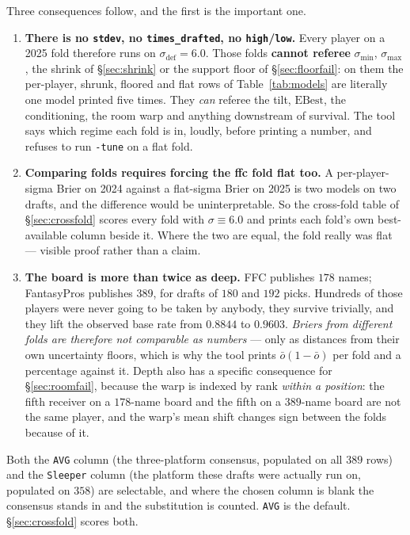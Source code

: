 \documentclass[10pt,a4paper]{article}
\theoremstyle{plain}
\theoremstyle{definition}
\theoremstyle{remark}
\newcommand{\code}[1]{\texttt{\small #1}}
\begin{document}
Three consequences follow, and the first is the important one.

\begin{enumerate}
\item \textbf{There is no \code{stdev}, no \code{times\_drafted}, no \code{high}/\code{low}.}
Every player on a 2025 fold therefore runs on $\sigma_{\text{def}} = 6.0$. Those folds
\textbf{cannot referee} $\sigma_{\min}$, $\sigma_{\max}$, the shrink of
\S\ref{sec:shrink} or the support floor of \S\ref{sec:floorfail}: on them the per-player,
shrunk, floored and flat rows of Table~\ref{tab:models} are literally one model printed
five times. They \emph{can} referee the tilt, $\mathrm{EBest}$, the conditioning, the room
warp and anything downstream of survival. The tool says which regime each fold is in,
loudly, before printing a number, and refuses to run \code{-tune} on a flat fold.

\item \textbf{Comparing folds requires forcing the ffc fold flat too.} A per-player-sigma
Brier on 2024 against a flat-sigma Brier on 2025 is two models on two drafts, and the
difference would be uninterpretable. So the cross-fold table of \S\ref{sec:crossfold}
scores every fold with $\sigma \equiv 6.0$ and prints each fold's own best-available
column beside it. Where the two are equal, the fold really was flat --- visible proof
rather than a claim.

\item \textbf{The board is more than twice as deep.} FFC publishes $178$ names;
FantasyPros publishes $389$, for drafts of $180$ and $192$ picks. Hundreds of those
players were never going to be taken by anybody, they survive trivially, and they lift the
observed base rate from $0.8844$ to $0.9603$. \emph{Briers from different folds are
therefore not comparable as numbers} --- only as distances from their own uncertainty
floors, which is why the tool prints $\bar o(1-\bar o)$ per fold and a percentage against
it. Depth also has a specific consequence for \S\ref{sec:roomfail}, because the warp is
indexed by rank \emph{within a position}: the fifth receiver on a $178$-name board and the
fifth on a $389$-name board are not the same player, and the warp's mean shift changes
sign between the folds because of it.
\end{enumerate}

Both the \code{AVG} column (the three-platform consensus, populated on all $389$ rows) and
the \code{Sleeper} column (the platform these drafts were actually run on, populated on
$358$) are selectable, and where the chosen column is blank the consensus stands in and
the substitution is counted. \code{AVG} is the default. \S\ref{sec:crossfold} scores both.
\end{document}
